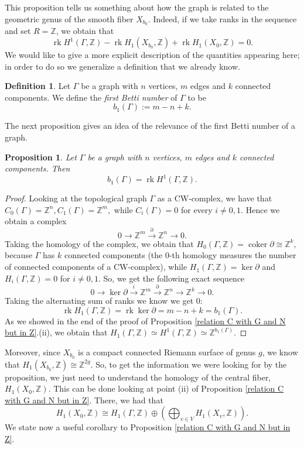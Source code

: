 \documentclass[a4paper,12 pt,titlepage,twoside]{book}
\newcommand{\numberset}{\mathbb}
\newcommand{\Z}{\numberset{Z}}
\DeclareMathOperator{\coker}{coker}
\DeclareMathOperator{\rk}{rk}
\theoremstyle{plain}
\theoremstyle{theorem}
\newtheorem{prop}[thm]{Proposition}
\theoremstyle{definition}
\newtheorem{defn}[thm]{Definition}
\theoremstyle{remark}
\begin{document}
	This proposition tells us something about how the graph is related to the geometric genus of the smooth fiber $X_{b_0}$. Indeed, if we take ranks in the sequence and set $R = \Z$, we obtain that $$\rk H^1(\Gamma,\Z) - \rk H_1(X_{b_0},\Z) + \rk H_1(X_0,\Z) = 0.$$ We would like to give a more explicit description of the quantities appearing here; in order to do so we generalize a definition that we already know.
	\begin{defn}
		Let $\Gamma$ be a graph with $n$ vertices, $m$ edges and $k$ connected components. We define the \emph{first Betti number} of $\Gamma$ to be $$b_1(\Gamma) := m - n + k.$$
	\end{defn}
	The next proposition gives an idea of the relevance of the first Betti number of a graph.
	\begin{prop}\label{prop: rank is betti}
		Let $\Gamma$ be a graph with $n$ vertices, $m$ edges and $k$ connected components. Then $$b_1(\Gamma) = \rk H^1(\Gamma, \Z).$$
	\end{prop}
	\begin{proof}
		Looking at the topological graph $\Gamma$ as a CW-complex, we have that $C_0(\Gamma) = \Z^n, C_1(\Gamma)= \Z^m,$ while $C_i(\Gamma)=0 $ for every $i \neq 0,1.$ Hence we obtain a complex $$0 \rightarrow \Z^m \stackrel{\partial}{\longrightarrow} \Z^n \rightarrow 0.$$ Taking the homology of the complex, we obtain that $H_0(\Gamma,\Z) = \coker \partial \cong \Z^k,$ because $\Gamma$ has $k$ connected components (the 0-th homology measures the number of connected components of a CW-complex), while $H_1(\Gamma,\Z) = \ker \partial$ and $H_i(\Gamma,\Z)=0$ for $i \neq 0,1.$ So, we get the following exact sequence $$0 \rightarrow\ker \partial \stackrel{i}{\longrightarrow} \Z^m \stackrel{\partial}{\longrightarrow} \Z^n \longrightarrow \Z^k \rightarrow 0.$$ Taking the alternating sum of ranks we know we get 0: $$\rk H_1(\Gamma,\Z) = \rk \ker \partial = m - n + k = b_1(\Gamma).$$ As we showed in the end of the proof of Proposition \ref{relation C with G and N but in Z}.(ii), we obtain that $H_1(\Gamma,\Z) \simeq H^1(\Gamma,\Z) \simeq \Z^{b_1(\Gamma)}.$
	\end{proof}
	Moreover, since $X_{b_0}$ is a compact connected Riemann surface of genus $g$, we know that $H_1(X_{b_0},\Z) \cong \Z^{2g}.$ So, to get the information we were looking for by the proposition, we just need to understand the homology of the central fiber, $H_1(X_0,\Z).$ This can be done looking at point (ii) of Proposition \ref{relation C with G and N but in Z}. There, we had that $$H_1(X_0,\Z) \cong H_1(\Gamma,\Z) \oplus \left(\bigoplus_{v \in V} H_1(X_v, \Z)\right).$$ We state now a useful corollary to Proposition \ref{relation C with G and N but in Z}.
\end{document}
